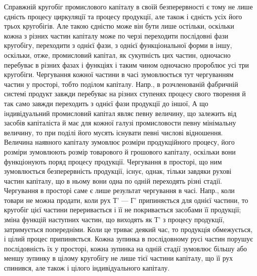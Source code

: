 Справжній кругобіг промислового капіталу в своїй безперервності
є тому не лише єдність процесу циркуляції та процесу продукції, але
також і єдність усіх його трьох кругобігів. Але такою єдністю може він
бути лише остільки, оскільки кожна з різних частин капіталу може по
черзі переходити послідовні фази кругобігу, переходити з однієї фази,
з однієї функціональної форми в іншу, оскільки, отже, промисловий капітал,
як сукупність цих частин, одночасно перебуває в різних фазах
і функціях і таким чином одночасно пророблює усі три кругобіги. Чергування
кожної частини в часі зумовлюється тут чергуванням частин у
просторі, тобто поділом капіталу. Напр., в розчленованій фабричній
системі продукт завжди перебуває на різних ступенях процесу свого
творення й так само завжди переходить з однієї фази продукції до іншої,
А що індивідуальний промисловий капітал являє певну величину, що
залежить від засобів капіталіста й має для кожної галузі промисловости
певну мінімальну величину, то при поділі його мусять існувати певні числові
відношення. Величина наявного капіталу зумовлює розміри продукційного
процесу, його розміри зумовлюють розмір товарового й грошового
капіталу, оскільки вони функціонують поряд процесу продукції. Чергування
в просторі, що ним зумовлюється безперервність продукції, існує, однак,
тільки завдяки рухові частин капіталу, що в ньому вони одна по одній переходять
різні стадії. Чергування в просторі саме є лише результат чергування
в часі. Напр., коли товари не можна продати, коли рух Т' — Г'
припиняється для однієї частини, то кругобіг цієї частини переривається
і її не покривається засобами її продукції; зміна функцій наступних
частин, що виходять як Т' з процесу продукції, затримується
попередніми. Коли це триває деякий час, то продукція обмежується, і
цілий процес припиняється. Кожна зупинка в послідовному русі частин
порушує послідовність їх у просторі, кожна зупинка на одній стадії
зумовлює більшу або меншу зупинку в цілому кругобігу не лише тієї
частини капіталу, що її рух спинився, але також і цілого індивідуального
капіталу.


